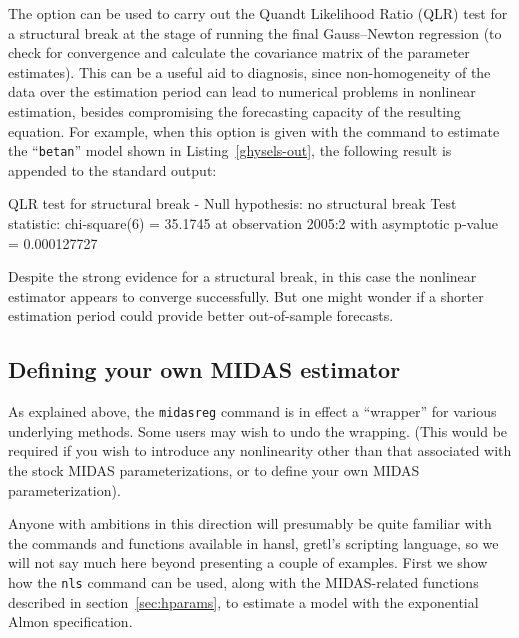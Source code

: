 The  option can be used to carry out the Quandt
Likelihood Ratio (QLR) test for a structural break at the stage of
running the final Gauss--Newton regression (to check for convergence
and calculate the covariance matrix of the parameter estimates).  This
can be a useful aid to diagnosis, since non-homogeneity of the data
over the estimation period can lead to numerical problems in nonlinear
estimation, besides compromising the forecasting capacity of the
resulting equation. For example, when this option is given with the
command to estimate the ``\texttt{betan}'' model shown in
Listing~\ref{ghysels-out}, the following result is appended to the
standard output:
%
\begin{code}
QLR test for structural break -
  Null hypothesis: no structural break
  Test statistic: chi-square(6) = 35.1745 at observation 2005:2
  with asymptotic p-value = 0.000127727
\end{code}
%
Despite the strong evidence for a structural break, in this case the
nonlinear estimator appears to converge successfully. But one might
wonder if a shorter estimation period could provide better
out-of-sample forecasts.

\subsection{Defining your own MIDAS estimator}

As explained above, the \texttt{midasreg} command is in effect a
``wrapper'' for various underlying methods. Some users may wish to
undo the wrapping. (This would be required if you wish to introduce
any nonlinearity other than that associated with the stock MIDAS
parameterizations, or to define your own MIDAS parameterization).

Anyone with ambitions in this direction will presumably be quite
familiar with the commands and functions available in hansl, gretl's
scripting language, so we will not say much here beyond presenting a
couple of examples. First we show how the \texttt{nls} command can be
used, along with the MIDAS-related functions described in
section~\ref{sec:hparams}, to estimate a model with the exponential
Almon specification.
%

